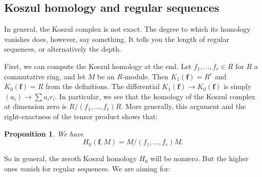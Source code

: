 \documentclass{article}
\newtheorem{proposition}{Proposition}
\begin{document}
\subsection{Koszul homology and regular sequences} 

In general, the Koszul complex is not exact. The degree to which its homology
vanishes does, however, say something. It tells you the length of regular
sequences, or alternatively the depth. 

First, we can compute the Koszul homology at the end. Let $f_1, \dots, f_r \in
R$ for $R$ a commutative ring, and let $M$ be an $R$-module. Then
$K_1(\mathbf{f}) = R^r$ and $K_0(\mathbf{f}) = R$ from the definitions. The
differential $K_1(\mathbf{f}) \to K_0(\mathbf{f})$ is simply $(a_i) \to \sum
a_i r_i$. In particular, we see that the homology of the Koszul complex at
dimension zero is $R/(f_1, \dots, f_r) R$. More generally, this argument and
the right-exactness of the tensor product shows that:

\begin{proposition} 
We have
\[ H_0(\mathbf{f}, M) = M/(f_1, \dots, f_r) M.  \]
\end{proposition} 

So in general, the zeroth Koszul homology $H_0$ will be nonzero. But the higher
ones vanish for regular sequences. 
We are aiming for:
\end{document}
